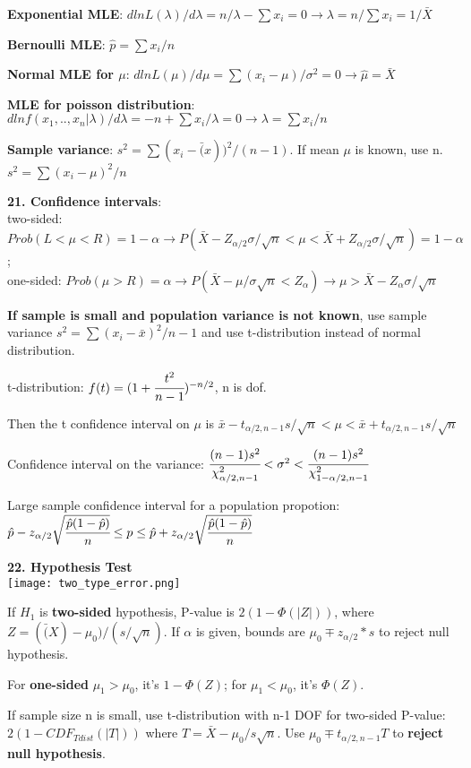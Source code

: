 \documentclass[a4paper,10pt,twocolumn]{article}
\begin{document}
\textbf{Exponential MLE}: $dlnL(\lambda)/d\lambda=n/\lambda-\sum x_i=0\rightarrow \lambda=n/\sum x_i=1/\bar{X}$

\textbf{Bernoulli MLE}: $\hat{p}=\sum x_i/n$

\textbf{Normal MLE for $\mu$}: $dln L(\mu)/d\mu=\sum(x_i-\mu)/\sigma^2=0\rightarrow \hat{\mu}=\bar{X}$

\textbf{MLE for poisson distribution}: $dln f(x_1,..,x_n|\lambda)/d\lambda=-n+\sum x_i/\lambda=0\rightarrow \lambda=\sum x_i/n$

\textbf{Sample variance}: $s^2=\sum (x_i-\bar(x))^2/(n-1)$. If mean $\mu$ is known, use n. $s^2=\sum (x_i-\mu)^2/n$

\textbf{21. Confidence intervals}: \\
two-sided: $Prob(L<\mu<R)=1-\alpha\rightarrow P(\bar{X}-Z_{\alpha/2}\sigma/\sqrt{n}<\mu<\bar{X}+Z_{\alpha/2}\sigma/\sqrt{n})=1-\alpha$; \\
one-sided: $Prob(\mu>R)=\alpha\rightarrow P(\bar{X}-\mu/\sigma\sqrt{n}<Z_\alpha)\rightarrow\mu>\bar{X}-Z_\alpha\sigma/\sqrt{n}$

\textbf{If sample is small and population variance is not known}, use sample variance $s^2=\sum (x_i-\bar{x})^2/n-1$ and use t-distribution instead of normal distribution.

t-distribution: $f(t)=(1+\cfrac{t^2}{n-1})^{-n/2}$, n is dof. 

Then the t confidence interval on $\mu$ is $\bar{x}-t_{\alpha/2,n-1}s/\sqrt{n}<\mu<\bar{x}+t_{\alpha/2,n-1}s/\sqrt{n}$

Confidence interval on the variance: $\cfrac{(n-1)s^2}{\chi^2_{\alpha/2,n-1}}<\sigma^2<\cfrac{(n-1)s^2}{\chi^2_{1-\alpha/2,n-1}}$

Large sample confidence interval for a population propotion: $\hat{p}-z_{\alpha/2}\sqrt{\cfrac{\hat{p}(1-\hat{p})}{n}} \le p \le \hat{p}+z_{\alpha/2}\sqrt{\cfrac{\hat{p}(1-\hat{p})}{n}}$

\textbf{22. Hypothesis Test}\\
\texttt{[image: two\_type\_error.png]}

If $H_1$ is \textbf{two-sided} hypothesis, P-value is $2(1-\Phi(|Z|))$, where $Z=(\bar(X)-\mu_0)/(s/\sqrt{n})$. If $\alpha$ is given, bounds are $\mu_0\mp z_{\alpha/2}*s$ to reject null hypothesis.

For \textbf{one-sided} $\mu_1>\mu_0$, it's $1-\Phi(Z)$; for $\mu_1<\mu_0$, it's $\Phi(Z)$. 

If sample size n is small, use t-distribution with n-1 DOF for two-sided P-value: $2(1-CDF_{Tdist}(|T|))$ where $T=\bar{X}-\mu_0/s\sqrt{n}$. Use $\mu_0\mp t_{\alpha/2,n-1}T$ to \textbf{reject null hypothesis}.
\end{document}
